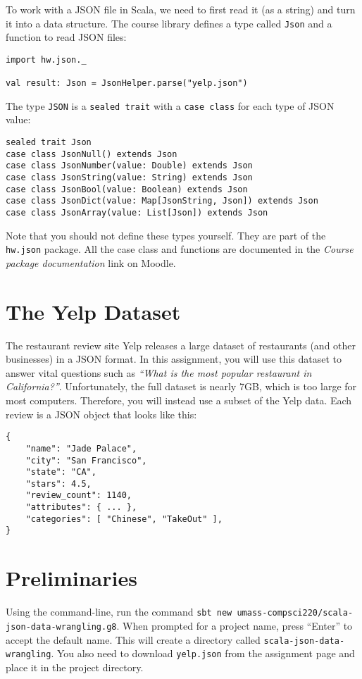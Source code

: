 \documentclass[9pt]{extbook}
\begin{document}
\lstset{language=scala}
To work with a JSON file in Scala, we need to first read it (as a string)
and turn it into a data structure. The course library defines
a type called \lstinline|Json| and a function to read JSON files:
\begin{lstlisting}
import hw.json._

val result: Json = JsonHelper.parse("yelp.json")
\end{lstlisting}
%
The type \lstinline|JSON| is a \lstinline|sealed trait| with a
\lstinline|case class| for each type of JSON value:
\begin{lstlisting}
sealed trait Json
case class JsonNull() extends Json
case class JsonNumber(value: Double) extends Json
case class JsonString(value: String) extends Json
case class JsonBool(value: Boolean) extends Json
case class JsonDict(value: Map[JsonString, Json]) extends Json
case class JsonArray(value: List[Json]) extends Json
\end{lstlisting}

Note that you should not define these types yourself. They are part of the
\lstinline|hw.json| package. All the case class and functions are documented in
the \emph{Course package documentation} link on Moodle.

\section{The Yelp Dataset}

The restaurant review site Yelp releases a large dataset of restaurants
(and other businesses) in a
JSON format. In this assignment, you will use this dataset to answer vital
questions such as \emph{``What is the most popular restaurant in
California?''}. Unfortunately, the full dataset is nearly 7GB, which is too
large for most computers. Therefore, you will instead use a subset of the Yelp
data. Each review is a JSON object that looks like this:
\begin{lstlisting}
{
    "name": "Jade Palace",
    "city": "San Francisco",
    "state": "CA",
    "stars": 4.5,
    "review_count": 1140,
    "attributes": { ... },
    "categories": [ "Chinese", "TakeOut" ],
}
\end{lstlisting}

\section{Preliminaries}

Using the command-line, run the command
\verb|sbt new umass-compsci220/scala-json-data-wrangling.g8|. When prompted for
a project name, press ``Enter'' to accept the default name. This will create
a directory called \verb|scala-json-data-wrangling|.
You also need to download \verb|yelp.json| from the assignment page
and place it in the project directory.
\end{document}
